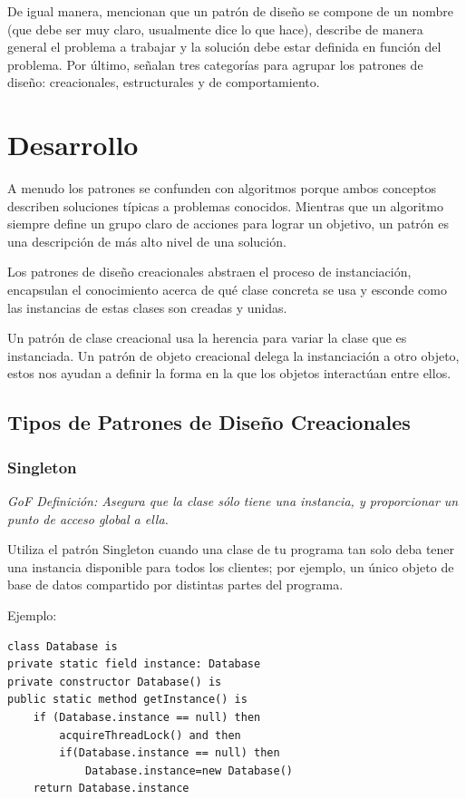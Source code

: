 \documentclass{article}
\begin{document}
\begin{multicols}{2}
 De igual manera, mencionan que un patrón de diseño se compone de un nombre (que debe ser muy claro, usualmente dice lo que hace), describe de manera general el problema a trabajar y la solución debe estar definida en función del problema. Por último, señalan tres categorías para agrupar los patrones de diseño: creacionales, estructurales y de comportamiento.

\section{Desarrollo}
 \quad A menudo los patrones se confunden con algoritmos porque ambos conceptos describen soluciones típicas a problemas conocidos. Mientras que un algoritmo siempre define un grupo claro de acciones para lograr un objetivo, un patrón es una descripción de más alto nivel de una solución.

Los patrones de diseño creacionales abstraen el proceso de instanciación, encapsulan el conocimiento acerca de qué clase concreta se usa y esconde como las instancias de estas clases son creadas y unidas.

Un patrón de clase creacional usa la herencia para variar la clase que es instanciada. Un patrón de objeto creacional delega la instanciación a otro objeto, estos nos ayudan a definir la forma en la que los objetos interactúan entre ellos.

\subsection{Tipos de Patrones de Diseño Creacionales}
\subsubsection{Singleton}

\textit{GoF Definición: Asegura que la clase sólo tiene una instancia, y proporcionar un punto de acceso global a ella.}

Utiliza el patrón Singleton cuando una clase de tu programa tan solo deba tener una instancia disponible para todos los clientes; por ejemplo, un único objeto de base de datos compartido por distintas partes del programa.

Ejemplo:
\begin{verbatim}
class Database is
private static field instance: Database
private constructor Database() is
public static method getInstance() is
    if (Database.instance == null) then
        acquireThreadLock() and then
        if(Database.instance == null) then
            Database.instance=new Database()
    return Database.instance
        

\end{verbatim}
\end{multicols}
\end{document}
